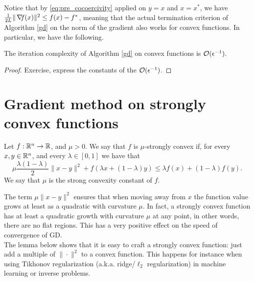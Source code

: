 \documentclass[10pt,a4paper]{article}
\begin{document}
Notice that by \eqref{eq:pre_cocoercivity} applied on $y=x$ and $x=x^*$, we have $ \frac{1}{2L}\|\operatorname*{\mathit{\nabla \!f}}(x) \|^2 \leq f(x)-f^*$, meaning that the actual termination criterion of Algorithm \ref{gd} on the norm of the gradient also works for convex functions. In particular, we have the following.
\begin{corollary}
	The iteration complexity of Algorithm \eqref{gd} on convex functions is $\mathcal{O}(\epsilon^{-1})$.
\end{corollary}
\begin{proof}
	Exercise, express the constants of the $\mathcal{O}(\epsilon^{-1})$.
\end{proof}

\section{Gradient method on strongly convex functions}

\begin{definition}
	Let $f : \mathbb{R}^n \to \mathbb{R}$, and $\mu > 0$. We say that $f$ is $\mu$-strongly convex if, for every $x, y \in \mathbb{R}^n$, and every $\lambda \in [0, 1]$ we have that
	\begin{equation*}
		\mu \frac{\lambda(1-\lambda)}{2} \|x - y\|^2 + f(\lambda x + (1-\lambda)y) \leq \lambda f(x) + (1-\lambda)f(y).
	\end{equation*}
We say that $\mu$ is the strong convexity constant of $f$.
\end{definition}
The term $ \mu\|x - y\|^2$ ensures that when moving away from $x$ the function value grows at least as a quadratic with curvature $\mu$. In fact, a strongly convex function has at least a quadratic growth with curvature $\mu$ at any point, in other words, there are no flat regions. This has a very positive effect on the speed of convergence of GD. \\



The lemma below shows that it is easy to craft a strongly convex function: just add a multiple of $\| \cdot \|^2$ to a convex function. This happens for instance when using Tikhonov regularization (a.k.a. ridge/$\ell_2$ regularization) in machine learning or inverse problems.
\end{document}
